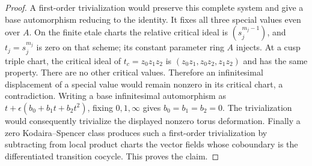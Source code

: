 \begin{proof}
A first-order trivialization would preserve this complete system and give a base automorphism reducing to the identity. It fixes all three special values even over $A$. On the finite etale charts the relative critical ideal is $(s_j^{m_j-1})$, and $t_j=s_j^{m_j}$ is zero on that scheme; its constant parameter ring $A$ injects. At a cusp triple chart, the critical ideal of $t_c=z_0z_1z_2$ is $(z_0z_1,z_0z_2,z_1z_2)$ and has the same property. There are no other critical values. Therefore an infinitesimal displacement of a special value would remain nonzero in its critical chart, a contradiction. Writing a base infinitesimal automorphism as $t+\epsilon(b_0+b_1t+b_2t^2)$, fixing $0,1,\infty$ gives $b_0=b_1=b_2=0$. The trivialization would consequently trivialize the displayed nonzero torus deformation. Finally a zero Kodaira--Spencer class produces such a first-order trivialization by subtracting from local product charts the vector fields whose coboundary is the differentiated transition cocycle. This proves the claim.
\end{proof}

